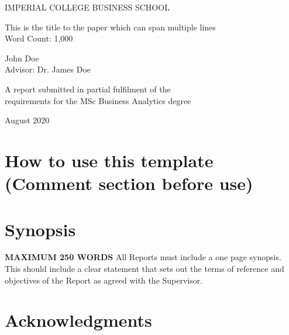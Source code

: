 \documentclass[a4paper,11]{article}
\begin{document}
	\begin{center}
		{\large IMPERIAL COLLEGE BUSINESS SCHOOL}
	\end{center}
	\vspace{6cm}
	
	\begin{center}
		
		\Huge This is the title to the paper which can span multiple lines\\		
		\vspace{.5cm}		
		\large {Word Count: 1,000}
		
	\end{center}
	\vspace{2.5cm}
	\begin{center}
		\Large John Doe\\Advisor: Dr. James Doe
	\end{center}
	
	\vspace{8cm}
	\begin{center}
		{\large A report submitted in partial fulfilment of the \\requirements for the MSc Business Analytics degree}
	\end{center}
	
	\begin{center}
		{\large August 2020}
	\end{center}		

	\newpage

\section{How to use this template (Comment section before use)}

\pagebreak

\section*{Synopsis}
\textbf{MAXIMUM 250 WORDS}
All Reports must include a one page synopsis. This should include a clear statement that sets out the terms of reference and objectives of the Report as agreed with the Supervisor.
%


\pagebreak

\section*{Acknowledgments}
%
\blindtext
\pagebreak
\end{document}
